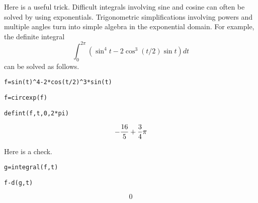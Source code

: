 
\newpage

\noindent
Here is a useful trick.
Difficult integrals involving sine and cosine
can often be solved by using exponentials.
Trigonometric simplifications involving powers
and multiple angles turn into simple algebra in the
exponential domain.
For example, the definite integral
$$\int_0^{2\pi}\left(\sin^4t-2\cos^3(t/2)\sin t\right)dt$$
can be solved as follows.

\medskip
\verb$f=sin(t)^4-2*cos(t/2)^3*sin(t)$

\verb$f=circexp(f)$

\verb$defint(f,t,0,2*pi)$

$$-{16\over5}+{3\over4}\pi$$

\medskip
\noindent
Here is a check.

\medskip
\verb$g=integral(f,t)$

\verb$f-d(g,t)$

$$0$$

